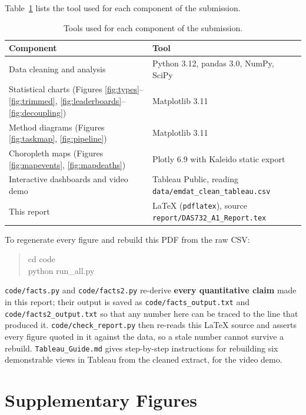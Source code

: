 \documentclass[11pt,a4paper]{article}
\begin{document}
Table~\ref{tab:tools} lists the tool used for each component of the submission.

\begin{table}[H]
\centering
\caption{Tools used for each component of the submission.}
\label{tab:tools}
\small
\begin{tabularx}{\linewidth}{@{}>{\raggedright\arraybackslash}p{6.2cm} X@{}}
\toprule
\textbf{Component} & \textbf{Tool}\\
\midrule
Data cleaning and analysis & Python 3.12, pandas 3.0, NumPy, SciPy\\
Statistical charts (Figures \ref{fig:types}--\ref{fig:trimmed},
  \ref{fig:leaderboards}--\ref{fig:decoupling}) & Matplotlib 3.11\\
Method diagrams (Figures \ref{fig:taskmap}, \ref{fig:pipeline}) & Matplotlib 3.11\\
Choropleth maps (Figures \ref{fig:mapevents}, \ref{fig:mapdeaths}) & Plotly 6.9 with Kaleido static export\\
Interactive dashboards and video demo & Tableau Public, reading \texttt{data/emdat\_clean\_tableau.csv}\\
This report & \LaTeX{} (\texttt{pdflatex}), source \texttt{report/DAS732\_A1\_Report.tex}\\
\bottomrule
\end{tabularx}
\end{table}

To regenerate every figure and rebuild this PDF from the raw CSV:

\begin{quote}\ttfamily
cd code\\
python run\_all.py
\end{quote}

\texttt{code/facts.py} and \texttt{code/facts2.py} re-derive \textbf{every
quantitative claim} made in this report; their output is saved as
\texttt{code/facts\_output.txt} and \texttt{code/facts2\_output.txt} so that any
number here can be traced to the line that produced it.
\texttt{code/check\_report.py} then re-reads this \LaTeX{} source and asserts
every figure quoted in it against the data, so a stale number cannot survive a
rebuild. \texttt{Tableau\_Guide.md} gives step-by-step instructions for
rebuilding six demonstrable views in Tableau from the cleaned extract, for the
video demo.


\section{Supplementary Figures}
\label{sec:supp}
\end{document}
